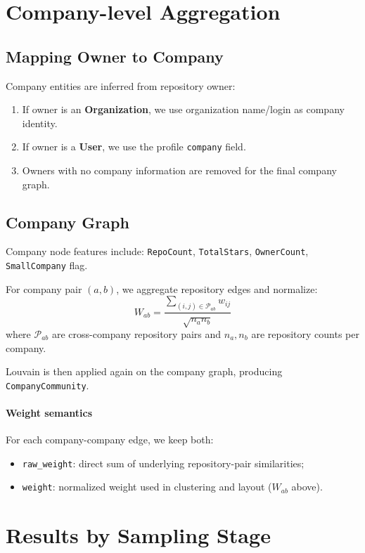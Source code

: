 \documentclass[11pt]{article}
\begin{document}
\section{Company-level Aggregation}
\subsection{Mapping Owner to Company}
Company entities are inferred from repository owner:
\begin{enumerate}[leftmargin=1.5em]
    \item If owner is an \textbf{Organization}, we use organization name/login as company identity.
    \item If owner is a \textbf{User}, we use the profile \texttt{company} field.
    \item Owners with no company information are removed for the final company graph.
\end{enumerate}

\subsection{Company Graph}
Company node features include:
\texttt{RepoCount}, \texttt{TotalStars}, \texttt{OwnerCount}, \texttt{SmallCompany} flag.

For company pair $(a,b)$, we aggregate repository edges and normalize:
\begin{equation}
W_{ab}=\frac{\sum_{(i,j)\in \mathcal{P}_{ab}} w_{ij}}{\sqrt{n_a n_b}}
\end{equation}
where $\mathcal{P}_{ab}$ are cross-company repository pairs and $n_a,n_b$ are repository counts per company.

Louvain is then applied again on the company graph, producing \texttt{CompanyCommunity}.
\paragraph{Weight semantics}
For each company-company edge, we keep both:
\begin{itemize}[leftmargin=1.5em]
    \item \texttt{raw\_weight}: direct sum of underlying repository-pair similarities;
    \item \texttt{weight}: normalized weight used in clustering and layout ($W_{ab}$ above).
\end{itemize}

\section{Results by Sampling Stage}
\end{document}
